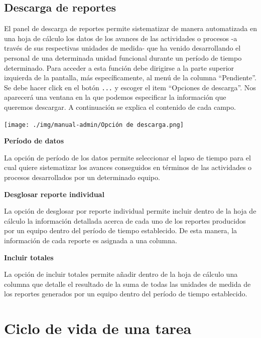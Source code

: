 \documentclass[
  letterpaper,
  DIV=11,
  numbers=noendperiod]{scrreprt}
\begin{document}
\hypertarget{descarga-de-reportes}{%
\section{Descarga de reportes}\label{descarga-de-reportes}}

El panel de descarga de reportes permite sistematizar de manera
automatizada en una hoja de cálculo los datos de los avances de las
actividades o procesos -a través de sus respectivas unidades de medida-
que ha venido desarrollando el personal de una determinada unidad
funcional durante un período de tiempo determinado. Para acceder a esta
función debe dirigirse a la parte superior izquierda de la pantalla, más
específicamente, al menú de la columna ``Pendiente''. Se debe hacer
click en el botón \texttt{...} y escoger el item ``Opciones de
descarga''. Nos aparecerá una ventana en la que podemos especificar la
información que queremos descargar. A continuación se explica el
contenido de cada campo.

\texttt{[image: ./img/manual-admin/Opción de descarga.png]}

\textbf{Período de datos}

La opción de período de los datos permite seleccionar el lapso de tiempo
para el cual quiere sistematizar los avances conseguidos en términos de
las actividades o procesos desarrollados por un determinado equipo.

\textbf{Desglosar reporte individual}

La opción de desglosar por reporte individual permite incluir dentro de
la hoja de cálculo la información detallada acerca de cada uno de los
reportes producidos por un equipo dentro del período de tiempo
establecido. De esta manera, la información de cada reporte es asignada
a una columna.

\textbf{Incluir totales}

La opción de incluir totales permite añadir dentro de la hoja de cálculo
una columna que detalle el resultado de la suma de todas las unidades de
medida de los reportes generados por un equipo dentro del período de
tiempo establecido.

\appendix
{}

\hypertarget{sec-ciclo-de-vida}{%
\chapter{Ciclo de vida de una tarea}\label{sec-ciclo-de-vida}}
\end{document}
